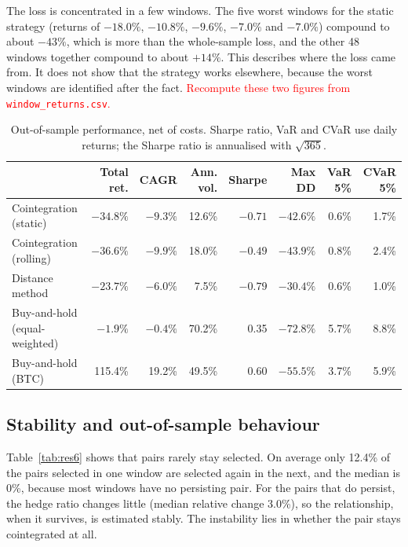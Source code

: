 \documentclass[10pt,a4paper,twocolumn]{article}
\newcommand{\TBD}[1]{\textcolor{red}{#1}}
\begin{document}
The loss is concentrated in a few windows. The five worst windows for the static strategy (returns of $-18.0\%$, $-10.8\%$, $-9.6\%$, $-7.0\%$ and $-7.0\%$) compound to about $-43\%$, which is more than the whole-sample loss, and the other 48 windows together compound to about $+14\%$. This describes where the loss came from. It does not show that the strategy works elsewhere, because the worst windows are identified after the fact. \TBD{Recompute these two figures from \texttt{window\_returns.csv}.}

\begin{table}[htbp]
	\centering
	\small
	\caption{Out-of-sample performance, net of costs. Sharpe ratio, VaR and CVaR use daily returns; the Sharpe ratio is annualised with $\sqrt{365}$.}
	\label{tab:res5}
	\begin{tabular}{@{}lrrrrrrr@{}}
		\toprule
		& Total ret. & CAGR & Ann. vol. & Sharpe & Max DD & VaR 5\% & CVaR 5\% \\
		\midrule
		Cointegration (static) & $-34.8\%$ & $-9.3\%$ & 12.6\% & $-0.71$ & $-42.6\%$ & 0.6\% & 1.7\% \\
		Cointegration (rolling) & $-36.6\%$ & $-9.9\%$ & 18.0\% & $-0.49$ & $-43.9\%$ & 0.8\% & 2.4\% \\
		Distance method & $-23.7\%$ & $-6.0\%$ & 7.5\% & $-0.79$ & $-30.4\%$ & 0.6\% & 1.0\% \\
		Buy-and-hold (equal-weighted) & $-1.9\%$ & $-0.4\%$ & 70.2\% & 0.35 & $-72.8\%$ & 5.7\% & 8.8\% \\
		Buy-and-hold (BTC) & 115.4\% & 19.2\% & 49.5\% & 0.60 & $-55.5\%$ & 3.7\% & 5.9\% \\
		\bottomrule
	\end{tabular}
\end{table}

\subsection{Stability and out-of-sample behaviour}
Table~\ref{tab:res6} shows that pairs rarely stay selected. On average only 12.4\% of the pairs selected in one window are selected again in the next, and the median is 0\%, because most windows have no persisting pair. For the pairs that do persist, the hedge ratio changes little (median relative change 3.0\%), so the relationship, when it survives, is estimated stably. The instability lies in whether the pair stays cointegrated at all.
\end{document}
